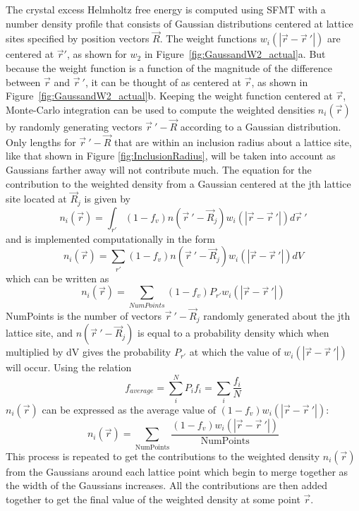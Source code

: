 \documentclass[double,12pt]{beavtex}
\begin{document}
The crystal excess Helmholtz free energy is computed  
using SFMT with a number density profile 
that consists of Gaussian distributions 
centered at lattice sites specified by position vectors $\vec R$. 
The weight functions $w_i(|\vec r - \vec r~'|)$ are centered at $\vec r'$,
as shown for $w_2$ in Figure~\ref{fig:GaussandW2_actual}a. 
But because the weight function is a function of the magnitude of the 
difference between $\vec r$ and $\vec r~'$, it can be thought of as 
centered at $\vec r$, as shown in Figure~\ref{fig:GaussandW2_actual}b.
Keeping the weight function centered at $\vec r$, 
Monte-Carlo integration can be used to compute the weighted densities $n_i(\vec r)$
by randomly generating vectors
$\vec r~' -\vec R$ according to a Gaussian distribution. 
Only lengths for $\vec r~'- \vec R$ that are within an inclusion radius
about a lattice site, like that shown in Figure \ref{fig:InclusionRadius}, 
will be taken into account as Gaussians 
farther away will not contribute much.
The equation for the contribution to the weighted density from a 
Gaussian centered at the jth lattice site located at $\vec R_j$ is given by
\begin{equation}{n_i(\vec r)= \int_{r'}{(1-f_v)n(\vec r~' - \vec R_j)w_i(|\vec{r}-\vec{r}~'|)} {d}\vec{r}~'}\end{equation} 
and is implemented computationally in the form
\begin{equation}{n_i(\vec r)= \sum_{r'}{(1-f_v)n(\vec r~' -\vec R_j)w_i(|\vec{r}-\vec{r}~'|)dV}}\end{equation} 
which can be written as
\begin{equation}{n_i(\vec r)= \sum_{NumPoints}(1-f_v)P_{r'}w_i(|\vec{r}-\vec{r}~'|)}\end{equation} 
NumPoints is the number of vectors $\vec r~' - \vec R_j$ randomly 
generated about the jth lattice site, and $n(\vec r~' - \vec R_j)$
is equal to a probability density which when multiplied by dV gives 
the probability $P_{r'}$ at which the value of $w_i(|\vec{r}-\vec{r}~'|)$ 
will occur. Using the relation
\begin{equation}{f_{average}=\sum_i^N{P_if_i}=\sum_i{\frac{f_i}{N}}}\end{equation} 
$n_i(\vec{r})$ can be expressed as the average value of $(1-f_v)w_i(|\vec{r}-\vec{r}~'|)$:
\begin{equation}{n_i(\vec{r})=\sum_{\text{NumPoints}}\frac{(1-f_v)w_i(|\vec{r}-\vec{r}~'|)}{\text{NumPoints}}}\end{equation}
This process is repeated to get the contributions to the weighted density 
$n_i(\vec r)$ from the Gaussians around each lattice point which begin to 
merge together as the width of the Gaussians increases.
All the contributions are then added together 
to get the final value of the weighted density at some point $\vec r$.
\end{document}
